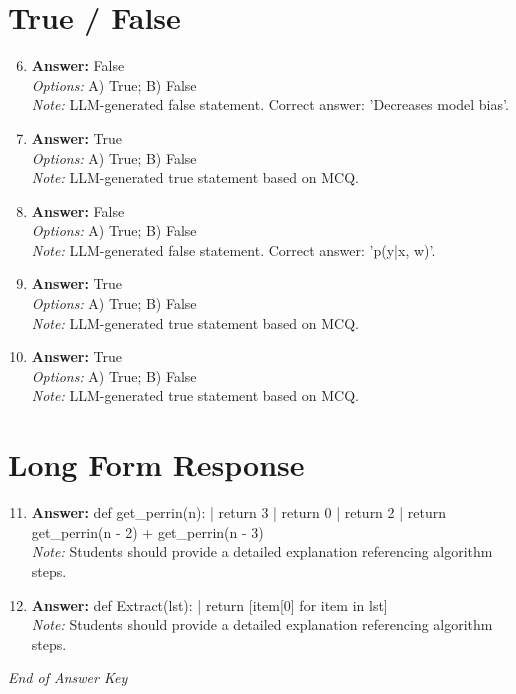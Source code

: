 \documentclass[12pt]{article}
\begin{document}
\section*{True / False}
\begin{enumerate}[label=\arabic*.]
\setcounter{enumi}{5}
\item \textbf{Answer:} False
\\ \textit{Options:} A) True; B) False
\\ \textit{Note:} LLM-generated false statement. Correct answer: 'Decreases model bias'.
\item \textbf{Answer:} True
\\ \textit{Options:} A) True; B) False
\\ \textit{Note:} LLM-generated true statement based on MCQ.
\item \textbf{Answer:} False
\\ \textit{Options:} A) True; B) False
\\ \textit{Note:} LLM-generated false statement. Correct answer: 'p(y|x, w)'.
\item \textbf{Answer:} True
\\ \textit{Options:} A) True; B) False
\\ \textit{Note:} LLM-generated true statement based on MCQ.
\item \textbf{Answer:} True
\\ \textit{Options:} A) True; B) False
\\ \textit{Note:} LLM-generated true statement based on MCQ.
\end{enumerate}

\section*{Long Form Response}
\begin{enumerate}[label=\arabic*.]
\setcounter{enumi}{10}
\item \textbf{Answer:} def get\_perrin(n): | return 3 | return 0 | return 2 | return get\_perrin(n - 2) + get\_perrin(n - 3)
\\ \textit{Note:} Students should provide a detailed explanation referencing algorithm steps.
\item \textbf{Answer:} def Extract(lst): | return [item[0] for item in lst]
\\ \textit{Note:} Students should provide a detailed explanation referencing algorithm steps.
\end{enumerate}

\vfill
\noindent\textit{End of Answer Key}
\end{document}
